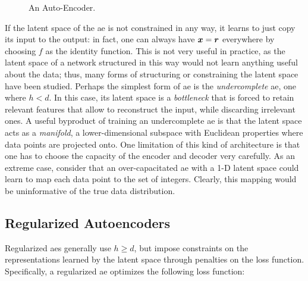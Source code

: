 \begin{figure*}[h!]
    \centering
    \resizebox{.45\textwidth}{!}{}
    \caption{An Auto-Encoder.}
    \label{fig:autoencoder}
\end{figure*}
If the latent space of the \gls{ae} is not constrained in any way, it learns to just copy its input to the output: in fact, one can always have $\Vector{x} = \Vector{r}$ everywhere by choosing $f$ as the identity function. This is not very useful in practice, as the latent space of a network structured in this way would not learn anything useful about the data; thus, many forms of structuring or constraining the latent space have been studied. Perhaps the simplest form of \gls{ae} is the \emph{undercomplete} \gls{ae}, \ie one where $h < d$. In this case, its latent space is a \emph{bottleneck} that is forced to retain relevant features that allow to reconstruct the input, while discarding irrelevant ones. A useful byproduct of training an undercomplete \gls{ae} is that the latent space acts as a \emph{manifold}, \ie a lower-dimensional subspace with Euclidean properties where data points are projected onto. One limitation of this kind of architecture is that one has to choose the capacity of the encoder and decoder very carefully. As an extreme case, consider that an over-capacitated \gls{ae} with a 1-D latent space could learn to map each data point to the set of integers. Clearly, this mapping would be uninformative of the true data distribution.

\subsection{Regularized Autoencoders}
Regularized \glspl{ae} generally use $h \geq d$, but impose constraints on the representations learned by the latent space through penalties on the loss function. Specifically, a regularized \gls{ae} optimizes the following loss function:

